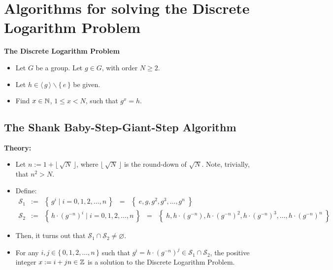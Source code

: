
\section{Algorithms for solving the Discrete Logarithm Problem}
\setcounter{theorem}{0}
\setcounter{equation}{0}

\vskip 1.0cm
\begin{center}
\begin{minipage}{0.50\textwidth}
	\begin{center}\textbf{The Discrete Logarithm Problem}\end{center}
	\begin{itemize}
	\item	Let $G$ be a group. Let $g \in G$, with order $N \geq 2$.
	\item	Let $h \in \langle\,g\,\rangle \backslash \{\,e\,\}$ be given.
	\item	Find $x \in \mathbb{N}$, $1 \leq x < N$, such that $g^{x} = h$.
	\end{itemize}
\end{minipage}
\end{center}
\vskip 1.0cm

\subsection{The Shank Baby-Step-Giant-Step Algorithm}

\noindent
\textbf{Theory:}
\begin{itemize}
\item	Let $n := 1 + \lfloor\,\sqrt{N}\,\rfloor$, where $\lfloor\,\sqrt{N}\,\rfloor$ is the round-down of $\sqrt{N}$.
		Note, trivially, that $n^{2} > N$.
\item	Define:
		\begin{eqnarray*}
		\mathcal{S}_{1} & := & \left\{\,g^{i}\;\vert\;i = 0,1,2,\ldots,n\,\right\}\;\;=\;\;\left\{\;e, g, g^{2}, g^{3}, \ldots, g^{n}\;\right\} \\
		\mathcal{S}_{2} & := & \left\{\,h\cdot(g^{-n})^{i}\;\vert\;i = 0,1,2,\ldots,n\,\right\}\;\;=\;\;\left\{\;h, h\cdot(g^{-n}), h\cdot(g^{-n})^{2}, h\cdot(g^{-n})^{3}, \ldots, h\cdot(g^{-n})^{n}\;\right\}
		\end{eqnarray*}
\item	Then, it turns out that $\mathcal{S}_{1}\cap\mathcal{S}_{2} \neq \varnothing$.
\item	For any $i, j \in \{\,0,1,2,\ldots,n\,\}$ such that $g^{i} = h\cdot(g^{-n})^{j} \in \mathcal{S}_{1}\cap\mathcal{S}_{2}$,
		the positive integer $x := i + jn \in \mathbb{Z}$ is a solution to the Discrete Logarithm Problem.
\end{itemize}

